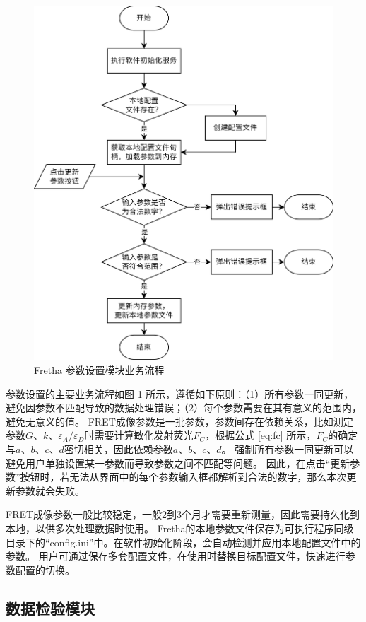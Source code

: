 \begin{figure}[hbtp]
  \centering
  \includegraphics[height=\linewidth]{../figures/2/Fretha业务-参数设置.drawio.png}
  \caption{Fretha 参数设置模块业务流程}
  \label{fig:fretha_param_module_flow}
\end{figure}
参数设置的主要业务流程如图 \ref{fig:fretha_param_module_flow} 所示，遵循如下原则：（1）所有参数一同更新，避免因参数不匹配导致的数据处理错误；（2）每个参数需要在其有意义的范围内，避免无意义的值。
FRET成像参数是一批参数，参数间存在依赖关系，比如测定参数$G$、$k$、$\varepsilon_{A}/\varepsilon_{D}$时需要计算敏化发射荧光$F_C$，根据公式 \ref{eq:fc} 所示，$F_C$的确定与$a$、$b$、$c$、$d$密切相关，因此依赖参数$a$、$b$、$c$、$d$。
强制所有参数一同更新可以避免用户单独设置某一参数而导致参数之间不匹配等问题。
因此，在点击“更新参数”按钮时，若无法从界面中的每个参数输入框都解析到合法的数字，那么本次更新参数就会失败。

FRET成像参数一般比较稳定，一般2到3个月才需要重新测量，因此需要持久化到本地，以供多次处理数据时使用。
Fretha的本地参数文件保存为可执行程序同级目录下的“config.ini”中。在软件初始化阶段，会自动检测并应用本地配置文件中的参数。
用户可通过保存多套配置文件，在使用时替换目标配置文件，快速进行参数配置的切换。

\subsection{数据检验模块}
\label{sec:数据检验模块}

